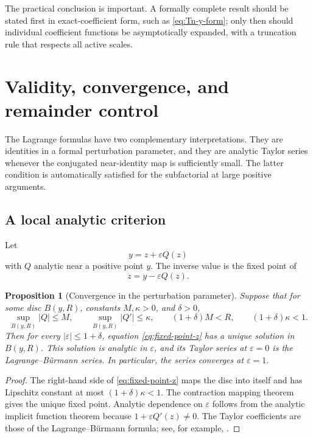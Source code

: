 \documentclass[11pt,oneside]{article}
\theoremstyle{plain}
\newtheorem{proposition}[theorem]{Proposition}
\theoremstyle{definition}
\theoremstyle{remark}
\newcommand{\abs}[1]{\left\lvert#1\right\rvert}
\begin{document}
The practical conclusion is important.  A formally complete result should be
stated first in exact-coefficient form, such as \eqref{eq:Tn-y-form}; only then
should individual coefficient functions be asymptotically expanded, with a
truncation rule that respects all active scales.

\section{Validity, convergence, and remainder control}
\label{sec:validity}

The Lagrange formulas have two complementary interpretations.  They are
identities in a formal perturbation parameter, and they are analytic Taylor
series whenever the conjugated near-identity map is sufficiently small.  The
latter condition is automatically satisfied for the subfactorial at large
positive arguments.

\subsection{A local analytic criterion}

Let
\begin{equation}
 y=z+\varepsilon Q(z)
 \label{eq:analytic-near-identity}
\end{equation}
with \(Q\) analytic near a positive point \(y\).  The inverse value is the
fixed point of
\begin{equation}
 z=y-\varepsilon Q(z).
 \label{eq:fixed-point-z}
\end{equation}

\begin{proposition}[Convergence in the perturbation parameter]
\label{prop:analytic-convergence}
Suppose that for some disc \(B(y,R)\), constants \(M,\kappa>0\), and
\(\delta>0\),
\begin{equation}
 \sup_{B(y,R)}\abs{Q}\le M,
 \qquad
 \sup_{B(y,R)}\abs{Q'}\le\kappa,
 \qquad
 (1+\delta)M<R,
 \qquad
 (1+\delta)\kappa<1.
 \label{eq:contraction-hypotheses}
\end{equation}
Then for every \(\abs{\varepsilon}\le1+\delta\), equation
\eqref{eq:fixed-point-z} has a unique solution in \(B(y,R)\).  This solution is
analytic in \(\varepsilon\), and its Taylor series at \(\varepsilon=0\) is the
Lagrange--B\"urmann series.  In particular, the series converges at
\(\varepsilon=1\).
\end{proposition}
\begin{proof}
The right-hand side of \eqref{eq:fixed-point-z} maps the disc into itself and
has Lipschitz constant at most \((1+\delta)\kappa<1\).  The contraction mapping
theorem gives the unique fixed point.  Analytic dependence on \(\varepsilon\)
follows from the analytic implicit function theorem because
\(1+\varepsilon Q'(z)\ne0\).  The Taylor coefficients are those of the
Lagrange--B\"urmann formula; see, for example, \cite{Sokal2009}.
\end{proof}
\end{document}
